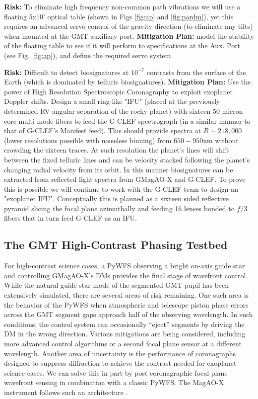 \documentclass[12pt,preprint]{aastex}
\begin{document}
\textbf{Risk:} To eliminate high frequency non-common path vibrations we will use a floating 5x10' optical table (shown in Figs \ref{fig:ap} and \ref{fig:pardm}), yet this requires an advanced servo control of the gravity direction (to eliminate any tilts) when mounted at the GMT auxiliary port. \textbf{Mitigation Plan:} model the stability of the floating table to see if it will perform to specifications at the Aux. Port (see Fig. \ref{fig:ap}), and define the required servo system.

\textbf{Risk:} Difficult to detect biosignatures at $10^{-7}$ contrasts from the surface of the Earth (which is dominated by telluric biosignatures). \textbf{Mitigation Plan:} Use the power of High Resolution Spectroscopic Coronagraphy to exploit exoplanet Doppler shifts. Design a small ring-like "IFU" (placed at the previously determined RV angular separation of the rocky planet) with sixteen 50 micron core multi-mode fibers to feed the G-CLEF spectrograph (in a similar manner to that of G-CLEF’s Manifest feed). This should provide spectra at $R\sim218,000$ (lower resolutions possible with noiseless binning) from  $650-950$nm without crowding the sixteen traces. At such resolution the planet’s lines will shift between the fixed telluric lines and can be velocity stacked following the planet’s changing radial velocity from its orbit. In this manner biosignatures can be extracted from reflected light spectra from GMagAO-X and G-CLEF. To prove this is possible we will continue to work with the G-CLEF team to design an "exoplanet IFU". Conceptually this is planned as a sixteen sided reflective pyramid slicing the focal plane azimuthally and feeding 16 lenses bonded to $f/3$ fibers that in turn feed G-CLEF as an IFU. 

\subsection{The GMT High-Contrast Phasing Testbed}
\label{subsection:testbed}
For high-contrast science cases, a PyWFS observing a bright on-axis guide star and controlling GMagAO-X's DMs provides the final stage of wavefront control. While the natural guide star mode of the segmented GMT pupil has been extensively simulated, there are several areas of risk remaining. One such area is the behavior of the PyWFS when atmospheric and telescope piston phase errors across the GMT segment gaps approach half of the observing wavelength. In such conditions, the control system can occasionally “eject” segments by driving the DM in the wrong direction. Various mitigations are being considered, including more advanced control algorithms or a second focal plane sensor at a different wavelength. Another area of uncertainty is the performance of coronagraphs designed to suppress diffraction to achieve the contrast needed for exoplanet science cases. We can solve this in part by post coronagraphic focal plane wavefront sensing in combination with a classic PyWFS. The MagAO-X instrument follows such an architecture \citep{2018SPIE10703E..09M, 2018SPIE10703E..4YC}.
\end{document}
